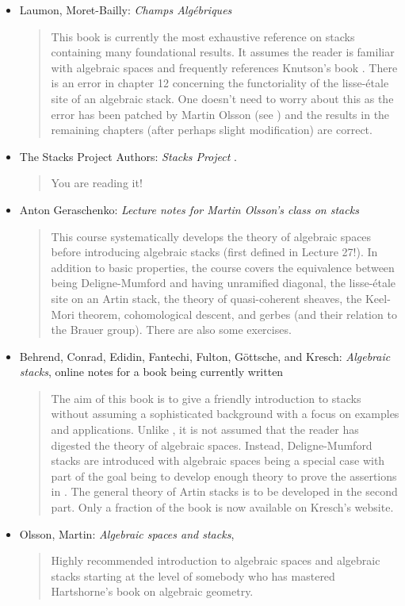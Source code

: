 \begin{itemize}
\item Laumon, Moret-Bailly: \emph{Champs Alg\'ebriques} \cite{LM-B}
\begin{quote}
This book is currently the most exhaustive reference on stacks containing
many foundational results. It assumes the reader is familiar with algebraic
spaces and frequently references Knutson's book \cite{Kn}. There is an
error in chapter 12 concerning the functoriality of the lisse-\'etale site of
an algebraic stack. One doesn't need to worry about this as the error has been
patched by Martin Olsson (see \cite{olsson_sheaves}) and the results in the
remaining chapters (after perhaps slight modification) are correct.
\end{quote}
\item The Stacks Project Authors: \emph{Stacks Project}
\cite{stacks-project}.
\begin{quote}
You are reading it!
\end{quote}
\item Anton Geraschenko:
\emph{Lecture notes for Martin Olsson's class on stacks} \cite{olsson_stacks}
\begin{quote}
This course systematically develops the theory of algebraic
spaces before introducing algebraic stacks (first defined in Lecture 27!). In
addition to basic properties, the course covers the equivalence between being
Deligne-Mumford and having unramified diagonal, the lisse-\'etale site on an
Artin stack, the theory of quasi-coherent sheaves, the Keel-Mori theorem,
cohomological descent, and gerbes (and their relation to the Brauer group).
There are also some exercises.
\end{quote}
\item
Behrend, Conrad, Edidin, Fantechi, Fulton, G\"ottsche, and Kresch:
\emph{Algebraic stacks}, online notes for a book being currently written
\cite{stacks_book}
\begin{quote}
The aim of this book is to give a friendly introduction to stacks without
assuming a sophisticated background with a focus on examples and applications.
Unlike \cite{LM-B}, it is not assumed that the reader has digested the theory of
algebraic spaces. Instead, Deligne-Mumford stacks are introduced with
algebraic spaces being a special case with part of the goal being to develop
enough theory to prove the assertions in \cite{DM}. The general
theory of Artin stacks is to be developed in the second part. Only a fraction
of the book is now available on Kresch's website.
\end{quote}
\item Olsson, Martin: \emph{Algebraic spaces and stacks}, \cite{olsson_book}
\begin{quote}
Highly recommended introduction to algebraic spaces and algebraic stacks
starting at the level of somebody who has mastered Hartshorne's book
on algebraic geometry.
\end{quote}
\end{itemize}


